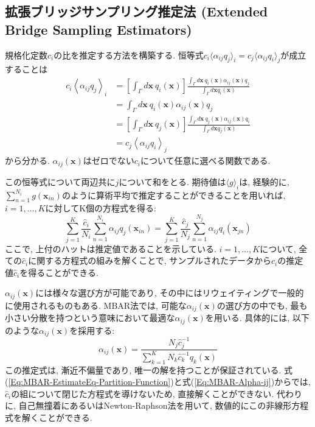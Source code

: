 \subsection{拡張ブリッジサンプリング推定法 (Extended Bridge Sampling Estimators)}
規格化定数$c_{i}$の比を推定する方法を構築する. 
恒等式$c_{i} \langle \alpha_{ij} q_{j} \rangle_{i} = c_{j} \langle \alpha_{ij} q_{i} \rangle_{j}$が成立することは
\begin{align}
    c_{i} \left\langle \alpha_{ij}q_{j} \right\rangle_{i} &=
    \left[\int_{\Gamma}d\bm{x}~ q_{i}(\bm{x})\right]
    \frac{\int_{\Gamma}d\bm{x}~ q_{i}(\bm{x}) \alpha_{ij}(\bm{x}) q_{j}}{\int_{\Gamma} d\bm{x} q_{i}(\bm{x})}
    \\ &=
    \int_{\Gamma}d\bm{x}~ q_{i}(\bm{x}) \alpha_{ij}(\bm{x}) q_{j}
    \\ &=
    \left[\int_{\Gamma}d\bm{x}~ q_{j}(\bm{x})\right]
    \frac{\int_{\Gamma}d\bm{x}~ q_{j}(\bm{x}) \alpha_{ij}(\bm{x}) q_{i}}{\int_{\Gamma} d\bm{x} q_{j}(\bm{x})}
    \\ &=
    c_{j} \left\langle \alpha_{ij}q_{i} \right\rangle_{j}
\end{align}
から分かる. $\alpha_{ij}(\bm{x})$はゼロでない$c_{i}$について任意に選べる関数である. 

この恒等式について両辺共に$j$について和をとる. 
期待値は$\langle g \rangle_{i}$は, 経験的に, $\sum_{n=1}^{N_{i}}g(\bm{x}_{in})$のように算術平均で推定することができることを用いれば, $i = 1,\ldots,K$に対してK個の方程式を得る:
\begin{equation}
    \sum_{j=1}^{K} \frac{\hat{c}_{i}}{N_{i}}
    \sum_{n=1}^{N_{i}} \alpha_{ij} q_{j}(\bm{x}_{in}) =
    \sum_{j=1}^{K} \frac{\hat{c}_{j}}{N_{j}}
    \sum_{n=1}^{N_{j}} \alpha_{ij} q_{i}(\bm{x}_{jn})
    \label{Eq:MBAR-EstimateEq-Partition-Function}
\end{equation}
ここで, 上付のハット$\hat{}$は推定値であることを示している. $i = 1,\ldots,K$について, 全ての$\hat{c}_{i}$に関する方程式の組みを解くことで, サンプルされたデータから$c_{i}$の推定値$\hat{c}_{i}$を得ることができる. 

$\alpha_{ij}(\bm{x})$には様々な選び方が可能であり, その中にはリウェイティングで一般的に使用されるものもある. MBAR法では, 可能な$\alpha_{ij}(\bm{x})$の選び方の中でも, 最も小さい分散を持つという意味において最適な$\alpha_{ij}(\bm{x})$を用いる. 
具体的には, 以下のような$\alpha_{ij}(\bm{x})$を採用する:
\begin{equation}
    \alpha_{ij}(\bm{x}) =
    \frac{N_{j}\hat{c}_{j}^{-1}}{\sum_{k=1}^{K}N_{k}\hat{c}_{k}^{-1}q_{k}(\bm{x})}
    \label{Eq:MBAR-Alpha-ij}
\end{equation}
この推定式は, 漸近不偏量であり, 唯一の解を持つことが保証されている. 
式(\ref{Eq:MBAR-EstimateEq-Partition-Function})と式(\ref{Eq:MBAR-Alpha-ij})からでは, $\hat{c}_{i}$の組について閉じた方程式を導けないため, 直接解くことができない. 
代わりに, 自己無撞着にあるいはNewton-Raphson法を用いて, 数値的にこの非線形方程式を解くことができる. 

